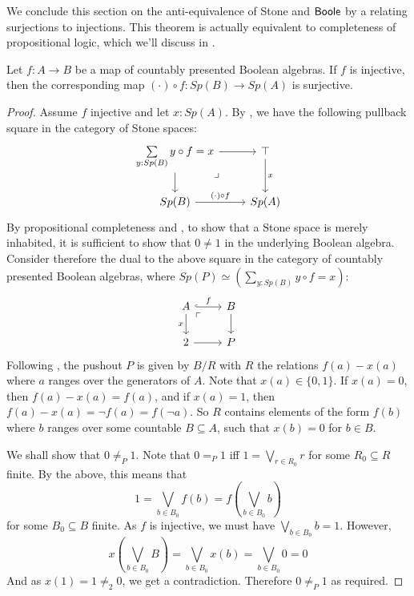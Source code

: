 We conclude this section on the anti-equivalence of Stone and $\mathsf{Boole}$ by a relating surjections to injections. 
This theorem is actually equivalent to completeness of propositional logic, which we'll discuss in 
. 
\begin{theorem}\label{FormalSurjectionsAreSurjections}
  Let $f:A\to B$ be a map of countably presented Boolean algebras. 
  If $f$ is injective, then the corresponding map $(\cdot) \circ f : Sp(B) \to Sp(A)$ is surjective. 
\end{theorem}

\begin{proof}
  Assume $f$ injective and let $x:Sp(A)$.
  By , we have the following pullback square in the category of Stone spaces:
  \begin{equation}\begin{tikzcd}
    \sum\limits_{y:Sp(B)} y\circ f = x \arrow[d] \arrow[r] \arrow["\lrcorner"{pos=0.125}, phantom, dr] 
    & \top \arrow[d,"x"]\\
    Sp(B) \arrow[r,"(\cdot) \circ f"] & Sp(A)
  \end{tikzcd}  \end{equation}
  By propositional completeness and ,
  to show that a Stone space is merely inhabited, it is sufficient to show that $0\neq 1$ in the underlying Boolean algebra. 
  Consider therefore the dual to the above square in the category of countably presented Boolean algebras,
  where $Sp(P) \simeq  (\sum\limits_{y:Sp(B)} y \circ f = x)$:
  \begin{equation}\begin{tikzcd}
    A \arrow[d,"x"'] \arrow[r,hook,"f"] \arrow[rd,phantom,"\ulcorner"{pos=0.125}] & B\arrow[d]\\
    2 \arrow[r] & P
  \end{tikzcd}\end{equation} 
  Following , the pushout $P$ is given by $B/R$ with $R$ the relations $f(a) -x(a)$ 
  where $a$ ranges over the generators of $A$.
  Note that $x(a) \in \{0,1\}$. 
  If $x(a)=0$, then $f(a)-x(a) = f(a)$, 
  and if $x(a) = 1$, then $f(a) -x(a) = \neg f(a) = f(\neg a)$. 
  So $R$ contains elements of the form $f(b)$ where $b$ ranges over some countable $B\subseteq A$, 
  such that $x(b) = 0$ for $b\in B$. 
  
  We shall show that $0\neq_P 1$. 
  Note that $0=_P 1$ iff 
  $1 = \bigvee_{r \in R_0} r$ for some $R_0\subseteq R$ finite. 
  By the above, this means that 
  $$1= \bigvee_{b\in B_0} f(b) = f(\bigvee_{b\in B_0} b)$$ 
  for some $B_0\subseteq B$ finite. 
  As $f$ is injective, we must have $\bigvee_{b\in B_0} b  = 1$. 
  However, 
  $$x(\bigvee_{b\in B_0} B ) = \bigvee_{b \in B_0} x(b) = \bigvee_{b\in B_0} 0 = 0$$
  And as $x(1) = 1 \neq_2 0$, we get a contradiction. Therefore $0\neq_P 1$ as required. 
\end{proof}  
